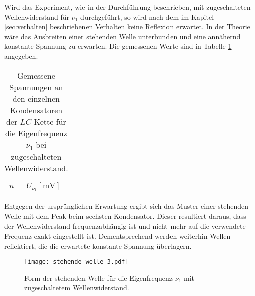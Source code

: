Wird das Experiment, wie in der Durchführung beschrieben, mit zugeschalteten Wellenwiderstand für $\nu_1$ durchgeführt, so wird nach dem im Kapitel \ref{sec:verhalten} beschriebenen Verhalten keine Reflexion erwartet.
In der Theorie wäre das Ausbreiten einer stehenden Welle unterbunden und eine annähernd konstante Spannung zu erwarten.
Die gemessenen Werte sind in Tabelle \ref{tab:stehend2} angegeben.
\begin{table}[H]
  \centering
  \caption{Gemessene Spannungen an den einzelnen Kondensatoren der $LC$-Kette für die Eigenfrequenz $\nu_1$ bei zugeschalteten Wellenwiderstand.}
  \label{tab:stehend2}
  \begin{tabular}{c c}
    \toprule
    {$n$} & {$U_{\nu_1} [\si{\milli\volt}]$}\\
    \midrule
    
    \bottomrule
  \end{tabular}
\end{table}
Entgegen der ursprünglichen Erwartung ergibt sich das Muster einer stehenden Welle mit dem Peak beim sechsten Kondensator.
Dieser resultiert daraus, dass der Wellenwiderstand frequenzabhängig ist und nicht mehr auf die verwendete Frequenz exakt eingestellt ist.
Dementsprechend werden weiterhin Wellen reflektiert, die die erwartete konstante Spannung überlagern.

\begin{figure}[H]
  \centering
  \texttt{[image: stehende\_welle\_3.pdf]}
  \caption{Form der stehenden Welle für die Eigenfrequenz $\nu_1$ mit zugeschaltetem Wellenwiderstand.}
  \label{fig:stehend3}
\end{figure}
